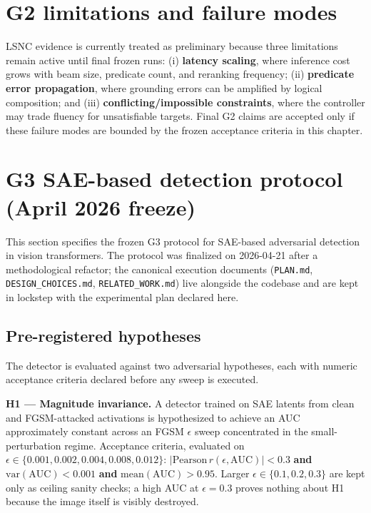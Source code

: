 \documentclass[../ppgc-tese.tex]{subfiles}
\begin{document}
\section{G2 limitations and failure modes}
\label{sec:g2-limitations}
LSNC evidence is currently treated as preliminary because three limitations remain active until final frozen runs: (i) \textbf{latency scaling}, where inference cost grows with beam size, predicate count, and reranking frequency; (ii) \textbf{predicate error propagation}, where grounding errors can be amplified by logical composition; and (iii) \textbf{conflicting/impossible constraints}, where the controller may trade fluency for unsatisfiable targets. Final G2 claims are accepted only if these failure modes are bounded by the frozen acceptance criteria in this chapter.

\section{G3 SAE-based detection protocol (April 2026 freeze)}
\label{sec:g3-protocol}
This section specifies the frozen G3 protocol for SAE-based adversarial detection in vision transformers. The protocol was finalized on 2026-04-21 after a methodological refactor; the canonical execution documents (\texttt{PLAN.md}, \texttt{DESIGN\_CHOICES.md}, \texttt{RELATED\_WORK.md}) live alongside the codebase \cite{carvalho2026interpretable_stego_detection_sae} and are kept in lockstep with the experimental plan declared here.

\subsection{Pre-registered hypotheses}
The detector is evaluated against two adversarial hypotheses, each with numeric acceptance criteria declared before any sweep is executed.

\textbf{H1 --- Magnitude invariance.} A detector trained on SAE latents from clean and FGSM-attacked activations is hypothesized to achieve an AUC approximately constant across an FGSM $\epsilon$ sweep concentrated in the small-perturbation regime. Acceptance criteria, evaluated on $\epsilon \in \{0.001, 0.002, 0.004, 0.008, 0.012\}$: $|\mathrm{Pearson}\,r(\epsilon, \mathrm{AUC})| < 0.3$ \textbf{and} $\mathrm{var}(\mathrm{AUC}) < 0.001$ \textbf{and} $\mathrm{mean}(\mathrm{AUC}) > 0.95$. Larger $\epsilon \in \{0.1, 0.2, 0.3\}$ are kept only as ceiling sanity checks; a high AUC at $\epsilon=0.3$ proves nothing about H1 because the image itself is visibly destroyed.
\end{document}
